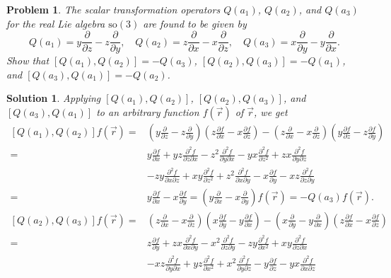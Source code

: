 \documentclass[UTF8,10pt,a4paper]{article}
\theoremstyle{Problem}
\newtheorem{prob}{Problem}
\theoremstyle{Solution}
\newtheorem*{sol}{Solution}
\begin{document}
\begin{prob}
    The scalar transformation operators $Q(a_1)$, $Q(a_2)$, and $Q(a_3)$ for the real Lie algebra $\text{so}(3)$ are found to be given by
    \[
        Q(a_1)=y\frac{\partial}{\partial z}-z\frac{\partial}{\partial y},\quad Q(a_2)=z\frac{\partial}{\partial x}-x\frac{\partial}{\partial z},\quad Q(a_3)=x\frac{\partial}{\partial y}-y\frac{\partial}{\partial x}.
    \]
    Show that $[Q(a_1),Q(a_2)]=-Q(a_3)$, $[Q(a_2),Q(a_3)]=-Q(a_1)$, and $[Q(a_3),Q(a_1)]=-Q(a_2)$.
\end{prob}
\begin{sol}
    Applying $[Q(a_1),Q(a_2)]$, $[Q(a_2),Q(a_3)]$, and $[Q(a_3),Q(a_1)]$ to an arbitrary function $f(\vec{r})$ of $\vec{r}$, we get
    \begin{align}
        \nonumber[Q(a_1),Q(a_2)]f(\vec{r})=&\left(y\frac{\partial}{\partial z}-z\frac{\partial}{\partial y}\right)\left(z\frac{\partial f}{\partial x}-x\frac{\partial f}{\partial z}\right)-\left(z\frac{\partial}{\partial x}-x\frac{\partial}{\partial z}\right)\left(y\frac{\partial f}{\partial z}-z\frac{\partial f}{\partial y}\right)\\
        \nonumber=&y\frac{\partial f}{\partial x}+yz\frac{\partial^2f}{\partial z\partial x}-z^2\frac{\partial^2f}{\partial y\partial x}-yx\frac{\partial^2f}{\partial z^2}+zx\frac{\partial^2f}{\partial y\partial z}\\
        \nonumber&-zy\frac{\partial^2f}{\partial x\partial z}+xy\frac{\partial^2f}{\partial z^2}+z^2\frac{\partial^2f}{\partial x\partial y}-x\frac{\partial f}{\partial y}-xz\frac{\partial^2f}{\partial z\partial y}\\
        =&y\frac{\partial f}{\partial x}-x\frac{\partial f}{\partial y}=\left(y\frac{\partial}{\partial x}-x\frac{\partial}{\partial y}\right)f(\vec{r})=-Q(a_3)f(\vec{r}).\\
        \nonumber[Q(a_2),Q(a_3)]f(\vec{r})=&\left(z\frac{\partial}{\partial x}-x\frac{\partial}{\partial z}\right)\left(x\frac{\partial f}{\partial y}-y\frac{\partial f}{\partial x}\right)-\left(x\frac{\partial}{\partial y}-y\frac{\partial}{\partial x}\right)\left(z\frac{\partial f}{\partial x}-x\frac{\partial f}{\partial z}\right)\\
        \nonumber=&z\frac{\partial f}{\partial y}+zx\frac{\partial^2f}{\partial x\partial y}-x^2\frac{\partial^2f}{\partial z\partial y}-zy\frac{\partial^2f}{\partial x^2}+xy\frac{\partial^2f}{\partial z\partial x}\\
        \nonumber&-xz\frac{\partial^2f}{\partial y\partial x}+yz\frac{\partial^2f}{\partial x^2}+x^2\frac{\partial^2f}{\partial y\partial z}-y\frac{\partial f}{\partial z}-yx\frac{\partial^2f}{\partial x\partial z}\\

\end{align}
\end{sol}
\end{document}
